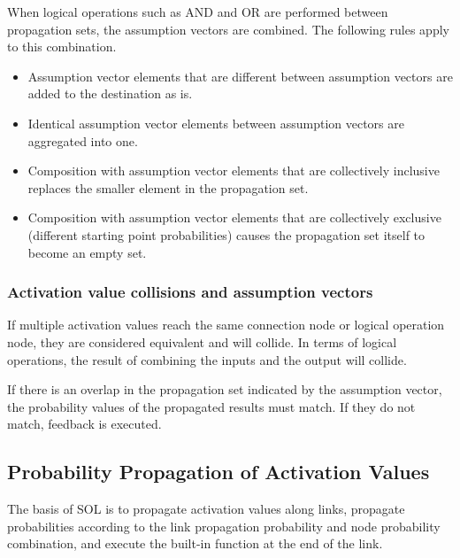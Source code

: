 \documentclass[12pt]{article}
\begin{document}
When logical operations such as AND and OR are performed between
propagation sets, the assumption vectors are combined. The following
rules apply to this combination.

\begin{itemize}

\item
  Assumption vector elements that are different between assumption
  vectors are added to the destination as is.
\item
  Identical assumption vector elements between assumption vectors are
  aggregated into one.
\item
  Composition with assumption vector elements that are collectively
  inclusive replaces the smaller element in the propagation set.
\item
  Composition with assumption vector elements that are collectively
  exclusive (different starting point probabilities) causes the
  propagation set itself to become an empty set.
\end{itemize}

\subsubsection{Activation value collisions and assumption
vectors}\label{activation-value-collisions-and-assumption-vectors}

If multiple activation values \hspace{0pt}\hspace{0pt}reach the same
connection node or logical operation node, they are considered
equivalent and will collide. In terms of logical operations, the result
of combining the inputs and the output will collide.

If there is an overlap in the propagation set indicated by the
assumption vector, the probability values \hspace{0pt}\hspace{0pt}of the
propagated results must match. If they do not match, feedback is
executed.

\subsection{Probability Propagation of Activation Values}\label{probability-propagation-of-activation-values}

The basis of SOL is to propagate activation values
\hspace{0pt}\hspace{0pt}along links, propagate probabilities according
to the link propagation probability and node probability combination,
and execute the built-in function at the end of the link.
\end{document}
